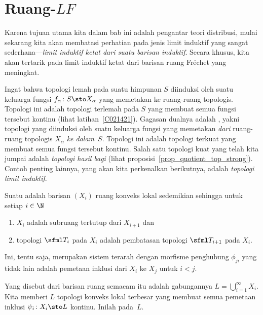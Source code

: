 \section{Ruang-$LF$}\label{sec_LFsps}
Karena tujuan utama kita dalam bab ini adalah pengantar teori distribusi, mulai sekarang kita akan membatasi perhatian
pada jenis limit induktif yang sangat sederhana---\emph{limit induktif ketat dari suatu barisan induktif}. Secara khusus, kita akan
tertarik pada limit induktif ketat dari barisan ruang Fr\'echet yang meningkat.


Ingat bahwa topologi lemah pada suatu himpunan $S$ diinduksi oleh suatu keluarga fungsi $f_\alpha \colon S \sto
X_\alpha$ yang memetakan ke ruang-ruang topologis. Topologi ini adalah topologi terlemah pada $S$ yang membuat
semua fungsi tersebut kontinu (lihat latihan~\ref{C021421}). Gagasan dualnya adalah
, yakni topologi yang diinduksi oleh suatu keluarga fungsi yang memetakan \emph{dari}
ruang-ruang topologis $X_\alpha$ \emph{ke dalam}~$S$. Topologi ini adalah topologi terkuat yang membuat
semua fungsi tersebut kontinu. Salah satu topologi kuat yang telah kita jumpai adalah
\emph{topologi hasil bagi} (lihat proposisi~\ref{prop_quotient_top_strong}). Contoh penting lainnya,
yang akan kita perkenalkan berikutnya, adalah \emph{topologi limit induktif}.


\begin{defn} Suatu
 adalah barisan $(X_i)$ ruang konveks lokal sedemikian sehingga untuk setiap $i \in \N$
   \begin{enumerate}
     \item[(i)] $X_i$ adalah subruang tertutup dari $X_{i+1}$ dan
     \item[(ii)] topologi $\sfml T_i$ pada $X_i$ adalah pembatasan topologi $\sfml T_{i+1}$ pada $X_i$.
   \end{enumerate}
Ini, tentu saja, merupakan sistem terarah dengan morfisme penghubung $\phi_{ji}$ yang tidak lain adalah pemetaan inklusi dari $X_i$ ke $X_j$ untuk $i < j$.

Yang disebut
 dari barisan ruang semacam itu adalah gabungannya $L = \bigcup_{i=1}^\infty X_i$. Kita memberi $L$ topologi
konveks lokal terbesar yang membuat semua pemetaan inklusi $\psi_i\colon X_i \sto L$ kontinu. Inilah
 pada~$L$.
\end{defn}

